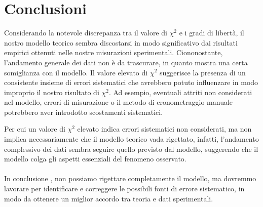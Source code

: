 \documentclass{article}
\begin{document}
\section{Conclusioni}
Considerando la notevole discrepanza tra il valore di $\chi^2$ e i gradi di libertà, il nostro modello teorico sembra discostarsi in modo significativo dai risultati empirici ottenuti nelle nostre misurazioni sperimentali. Ciononostante, l'andamento generale dei dati non è da trascurare, in quanto mostra una certa somiglianza con il modello. Il valore elevato di $\chi^2$ suggerisce la presenza di un consistente insieme di errori sistematici che avrebbero potuto influenzare in modo improprio il nostro risultato di $\chi^2$. Ad esempio, eventuali attriti non considerati nel modello, errori di misurazione o il metodo di cronometraggio manuale potrebbero aver introdotto scostamenti sistematici. 

Per cui un valore di $\chi^2$ elevato indica errori sistematici non considerati, ma non implica necessariamente che il modello teorico vada rigettato, infatti, l'andamento complessivo dei dati sembra seguire quello previsto dal modello, suggerendo che il modello colga gli aspetti essenziali del fenomeno osservato. \\\\In conclusione , non possiamo rigettare completamente il modello, ma dovremmo lavorare per identificare e correggere le possibili fonti di errore sistematico, in modo da ottenere un miglior accordo tra teoria e dati sperimentali.
\end{document}
